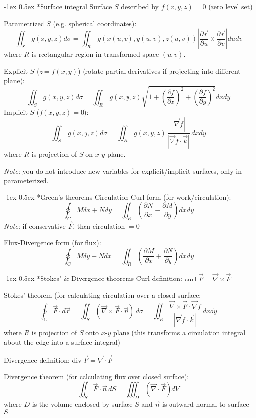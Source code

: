\documentclass[10pt,landscape]{article}
\makeatletter
\renewcommand{\section}{\@startsection{section}{1}{0mm}%
                                {-1ex}%
                                {0.5ex}%
                                {\normalfont\large\bfseries}}
\let \ds \displaystyle
\makeatother
\begin{document}
\begin{multicols}{3}
\section*{Surface integral}
Surface $S$ described by $f(x,y,z) = 0$ (zero level set)
\par Parametrized $S$ (e.g. spherical coordinates):
\[ \ds{\iint_S\,g(x,y,z)d\sigma = \iint_R\,g(x(u,v),y(u,v),z(u,v))\left|\frac{\partial\vec{r}}{\partial u}\times\frac{\partial\vec{r}}{\partial v}\right|dudv }\]
 where $R$ is rectangular region in transformed space $(u,v)$. 
\par Explicit $S$ ($z=f(x,y)$) (rotate partial derivatives if projecting into different plane):
 \[ \ds{\iint_S\,g(x,y,z)d\sigma = \iint_R\,g(x,y,z)\sqrt{1+\left(\frac{\partial f}{\partial x}\right)^2+\left(\frac{\partial f}{\partial y}\right)^2}dxdy } \]
Implicit $S$ ($f(x,y,z)=0$):
  \[\ds{\iint_S\,g(x,y,z)d\sigma = \iint_R\,g(x,y,z)\,\frac{|\vec{\nabla}f|}{|\vec{\nabla}f\cdot\vec{k}|}\,dxdy }\] 
where $R$ is projection of $S$ on $x$-$y$ plane. 
\par \textit{Note:} you do not introduce new variables for explicit/implicit surfaces, only in parameterized.

\section*{Green's theorems}
Circulation-Curl form (for work/circulation):
\[ \ds{ \oint_C Mdx+Ndy = \iint_R\left(\frac{\partial N}{\partial x}-\frac{\partial M}{\partial y}\right)dxdy }\]
\textit{Note:} if conservative $\vec{F} $, then circulation $= 0$ 
\par Flux-Divergence form (for flux):
\[ \ds{ \oint_C Mdy-Ndx = \iint_R\left(\frac{\partial M}{\partial x}+\frac{\partial N}{\partial y}\right)dxdy } \]

\section*{Stokes' \& Divergence theorems}
Curl definition: $\text{curl }\vec{F} = \vec{\nabla}\times\vec{F} $
\par Stokes' theorem (for calculating circulation over a closed surface: 
\[ \ds{ \oint_C \vec{F}\cdot d\vec{r} = \iint_S(\vec{\nabla}\times\vec{F}\cdot\vec{n})\,d\sigma =
    \iint_R\frac{\vec{\nabla}\times\vec{F}\cdot\vec{\nabla}f}{|\vec{\nabla}f\cdot\vec{k}|}\,dxdy }\]
where $R$ is projection of $S$ onto $x$-$y$ plane (this transforms a circulation integral about the edge into a surface integral)
\par Divergence definition: $\text{div }\vec{F} = \vec{\nabla}\cdot\vec{F}$
\par Divergence theorem (for calculating flux over closed surface):
 \[ \ds{ \iint_S \vec{F}\cdot\vec{n}\,dS = \iiint_D(\vec{\nabla}\cdot\vec{F})dV }\] 
where $D$ is the volume enclosed by surface $S$ and $\vec{n}$ is outward normal to surface $S$



\end{multicols}
\end{document}
